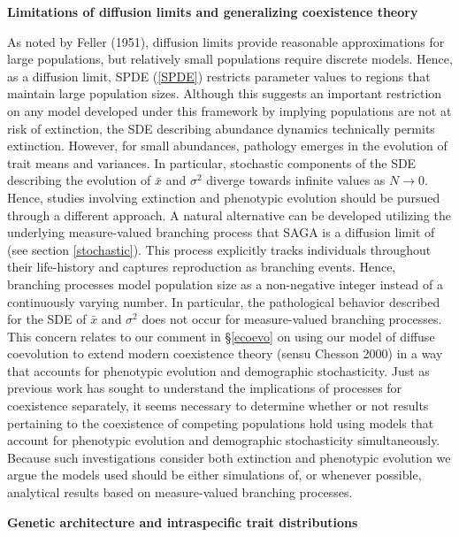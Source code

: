 \documentclass[]{article}
\begin{document}
\textbf{Limitations of diffusion limits and generalizing coexistence
theory}

As noted by Feller (1951), diffusion limits provide reasonable
approximations for large populations, but relatively small populations
require discrete models. Hence, as a diffusion limit, SPDE (\ref{SPDE})
restricts parameter values to regions that maintain large population
sizes. Although this suggests an important restriction on any model
developed under this framework by implying populations are not at risk
of extinction, the SDE describing abundance dynamics technically permits
extinction. However, for small abundances, pathology emerges in the
evolution of trait means and variances. In particular, stochastic
components of the SDE describing the evolution of \(\bar x\) and
\(\sigma^2\) diverge towards infinite values as \(N\to0\). Hence,
studies involving extinction and phenotypic evolution should be pursued
through a different approach. A natural alternative can be developed
utilizing the underlying measure-valued branching process that SAGA is a
diffusion limit of (see section \ref{stochastic}). This process
explicitly tracks individuals throughout their life-history and captures
reproduction as branching events. Hence, branching processes model
population size as a non-negative integer instead of a continuously
varying number. In particular, the pathological behavior described for
the SDE of \(\bar x\) and \(\sigma^2\) does not occur for measure-valued
branching processes. This concern relates to our comment in
\S\ref{ecoevo} on using our model of diffuse coevolution to extend
modern coexistence theory (sensu Chesson 2000) in a way that accounts
for phenotypic evolution and demographic stochasticity. Just as previous
work has sought to understand the implications of processes for
coexistence separately, it seems necessary to determine whether or not
results pertaining to the coexistence of competing populations hold
using models that account for phenotypic evolution and demographic
stochasticity simultaneously. Because such investigations consider both
extinction and phenotypic evolution we argue the models used should be
either simulations of, or whenever possible, analytical results based on
measure-valued branching processes.

\textbf{Genetic architecture and intraspecific trait distributions}
\end{document}
